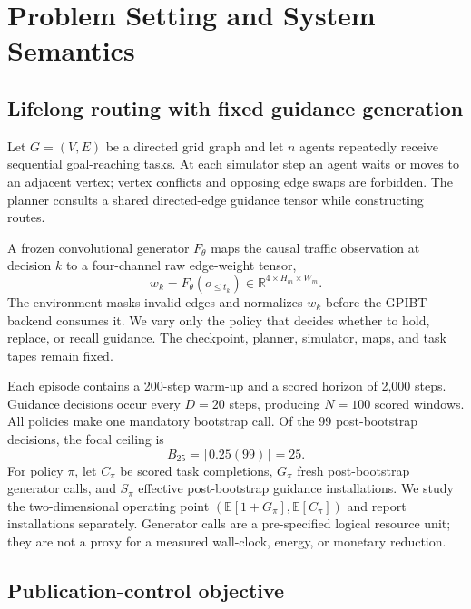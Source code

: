 \documentclass[sigconf,review,anonymous]{acmart}
\begin{document}
\section{Problem Setting and System Semantics}

\subsection{Lifelong routing with fixed guidance generation}

Let $G=(V,E)$ be a directed grid graph and let $n$ agents repeatedly receive
sequential goal-reaching tasks. At each simulator step an agent waits or moves
to an adjacent vertex; vertex conflicts and opposing edge swaps are forbidden.
The planner consults a shared directed-edge guidance tensor while constructing
routes.

A frozen convolutional generator $F_\theta$ maps the causal traffic
observation at decision $k$ to a four-channel raw edge-weight tensor,
\begin{equation}
  w_k=F_\theta(o_{\leq t_k})\in\mathbb{R}^{4\times H_m\times W_m}.
\end{equation}
The environment masks invalid edges and normalizes $w_k$ before the GPIBT
backend consumes it. We vary only the policy that decides whether to hold,
replace, or recall guidance. The checkpoint, planner, simulator, maps, and task
tapes remain fixed.

Each episode contains a 200-step warm-up and a scored horizon of 2,000 steps.
Guidance decisions occur every $D=20$ steps, producing $N=100$ scored windows.
All policies make one mandatory bootstrap call. Of the 99 post-bootstrap
decisions, the focal ceiling is
\begin{equation}
  B_{25}=\lceil0.25(99)\rceil=25.
\end{equation}
For policy $\pi$, let $C_\pi$ be scored task completions, $G_\pi$ fresh
post-bootstrap generator calls, and $S_\pi$ effective post-bootstrap guidance
installations. We study the two-dimensional operating point
$(\mathbb{E}[1+G_\pi],\mathbb{E}[C_\pi])$ and report installations separately.
Generator calls are a pre-specified logical resource unit; they are not a proxy
for a measured wall-clock, energy, or monetary reduction.

\subsection{Publication-control objective}
\end{document}
